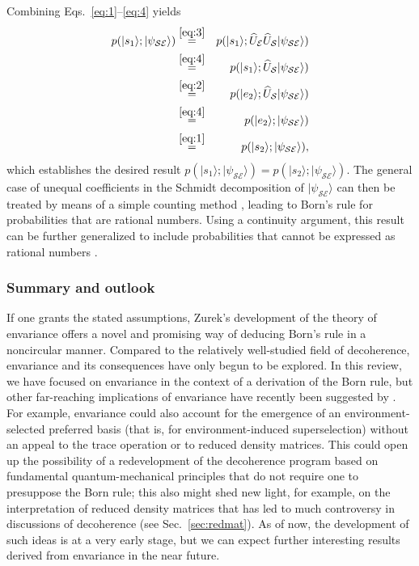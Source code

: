\documentclass[twocolumn,rmp,aps,amsmath,amsfonts,noshowkeys,noshowpacs]{revtex4}
\newcommand{\ket}[1]{\ensuremath{|{#1\rangle}}}
\begin{document}
%
Combining Eqs.~\eqref{eq:1}--\eqref{eq:4} yields
%
\begin{eqnarray}
  p(\ket{s_1}; \ket{\psi_\mathcal{SE}}) &\stackrel{\eqref{eq:3}}{=}& p(\ket{s_1};
  \widehat{U}_\mathcal{E} \widehat{U}_\mathcal{S}
  \ket{\psi_\mathcal{SE}}) \nonumber \\ &\stackrel{\eqref{eq:4}}{=}&
  p(\ket{s_1}; \widehat{U}_\mathcal{S} 
  \ket{\psi_\mathcal{SE}}) \nonumber \\ &\stackrel{\eqref{eq:2}}{=}&
  p(\ket{e_2}; \widehat{U}_\mathcal{S} 
  \ket{\psi_\mathcal{SE}})  \nonumber \\ &\stackrel{\eqref{eq:4}}{=}& p(\ket{e_2};
  \ket{\psi_\mathcal{SE}})  \nonumber \\ &\stackrel{\eqref{eq:1}}{=} &
  p(\ket{s_2}; \ket{\psi_\mathcal{SE}}),
\end{eqnarray}
%
which establishes the desired result $p(\ket{s_1};
\ket{\psi_\mathcal{SE}})=p(\ket{s_2}; \ket{\psi_\mathcal{SE}})$.  The
general case of unequal coefficients in the Schmidt decomposition of
$\ket{\psi_\mathcal{SE}}$ can then be treated by means of a simple
counting method \citep{Zurek:2003:rv,Zurek:2004:yb}, leading to Born's
rule for probabilities that are rational numbers. Using a continuity
argument, this result can be further generalized to include
probabilities that cannot be expressed as rational numbers
\citep{Zurek:2004:yb}.

\subsubsection{Summary and outlook}

If one grants the stated assumptions, Zurek's development of the
theory of envariance offers a novel and promising way of deducing
Born's rule in a noncircular manner.  Compared to the relatively
well-studied field of decoherence, envariance and its consequences
have only begun to be explored. In this review, we have focused on
envariance in the context of a derivation of the Born rule, but other
far-reaching implications of envariance have recently been suggested
by \citet{Zurek:2004:yb}.  For example, envariance could also account
for the emergence of an environment-selected preferred basis (that is,
for environment-induced superselection) without an appeal to the trace
operation or to reduced density matrices. This could open up the
possibility of a redevelopment of the decoherence program based on
fundamental quantum-mechanical principles that do not require one to
presuppose the Born rule; this also might shed new light, for example,
on the interpretation of reduced density matrices that has led to much
controversy in discussions of decoherence (see Sec.~\ref{sec:redmat}).
As of now, the development of such ideas is at a very early stage, but
we can expect further interesting results derived from envariance in
the near future.
\end{document}
